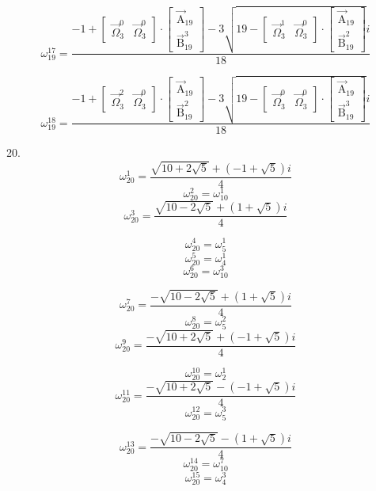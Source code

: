 \documentclass{article}
\begin{document}
\[ \omega_{19}^{17}=\frac{-1+\left[ \begin{matrix} \vec{\Omega}_{3}^{0} & \vec{\Omega}_{3}^{0} \end{matrix} \right]\cdot\left[ \begin{matrix} \vec{\mathrm{A}}_{19} \\ \vec{\mathrm{B}}_{19}^{3} \end{matrix} \right]-3\sqrt{19-\left[ \begin{matrix} \vec{\Omega}_{3}^{1} & \vec{\Omega}_{3}^{0} \end{matrix} \right]\cdot\left[ \begin{matrix} \vec{\mathrm{A}}_{19} \\ \vec{\mathrm{B}}_{19}^{2} \end{matrix} \right]}i}{18} \]

\[ \omega_{19}^{18}=\frac{-1+\left[ \begin{matrix} \vec{\Omega}_{3}^{2} & \vec{\Omega}_{3}^{0} \end{matrix} \right]\cdot\left[ \begin{matrix} \vec{\mathrm{A}}_{19} \\ \vec{\mathrm{B}}_{19}^{2} \end{matrix} \right]-3\sqrt{19-\left[ \begin{matrix} \vec{\Omega}_{3}^{0} & \vec{\Omega}_{3}^{0} \end{matrix} \right]\cdot\left[ \begin{matrix} \vec{\mathrm{A}}_{19} \\ \vec{\mathrm{B}}_{19}^{3} \end{matrix} \right]}i}{18} \]

20.
\[ \omega_{20}^{1}=\frac{\sqrt{10+2\sqrt{5}}+(-1+\sqrt{5})i}{4} \]
\[ \omega_{20}^{2}=\omega_{10}^{1} \]
\[ \omega_{20}^{3}=\frac{\sqrt{10-2\sqrt{5}}+(1+\sqrt{5})i}{4} \]

\[ \omega_{20}^{4}=\omega_{5}^{1} \]
\[ \omega_{20}^{5}=\omega_{4}^{1} \]
\[ \omega_{20}^{6}=\omega_{10}^{3} \]

\[ \omega_{20}^{7}=\frac{-\sqrt{10-2\sqrt{5}}+(1+\sqrt{5})i}{4} \]
\[ \omega_{20}^{8}=\omega_{5}^{2} \]
\[ \omega_{20}^{9}=\frac{-\sqrt{10+2\sqrt{5}}+(-1+\sqrt{5})i}{4} \]

\[ \omega_{20}^{10}=\omega_{2}^{1} \]
\[ \omega_{20}^{11}=\frac{-\sqrt{10+2\sqrt{5}}-(-1+\sqrt{5})i}{4} \]
\[ \omega_{20}^{12}=\omega_{5}^{3} \]

\[ \omega_{20}^{13}=\frac{-\sqrt{10-2\sqrt{5}}-(1+\sqrt{5})i}{4} \]
\[ \omega_{20}^{14}=\omega_{10}^{7} \]
\[ \omega_{20}^{15}=\omega_{4}^{3} \]
\end{document}
